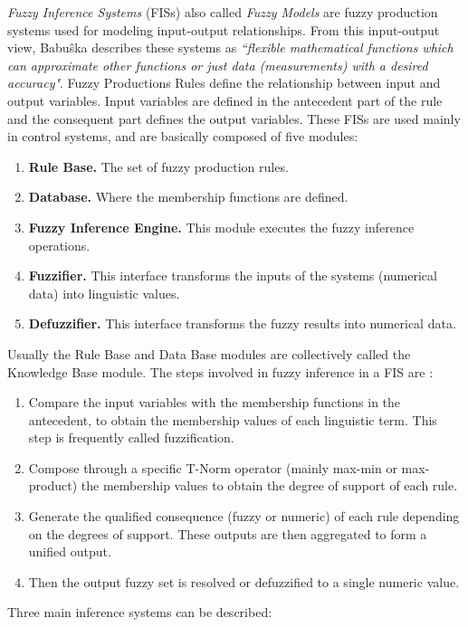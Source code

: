\textit{Fuzzy Inference Systems} (FISs) also called \textit{Fuzzy
Models} are fuzzy production systems used for modeling input-output
relationships. From this input-output view, Babuŝka
\cite{babuvska1996fuzzy} describes these systems as \textit{``flexible
mathematical functions which can approximate other functions or just
data (measurements) with a desired accuracy"}. Fuzzy Productions Rules
define the relationship between input and output variables. Input
variables are defined in the antecedent part of the rule and the
consequent part defines the output variables. These FISs are used
mainly in control systems, and are basically composed of five
modules\cite{babuvska1996fuzzy}:
\begin{enumerate}  
\item \textbf{Rule Base.} The set of fuzzy production rules.
\item \textbf{Database.} Where the membership functions are defined.
\item \textbf{Fuzzy Inference Engine.} This module executes the 
fuzzy inference operations.
\item \textbf{Fuzzifier.} This interface transforms the inputs 
of the systems (numerical data) into linguistic values.
\item \textbf{Defuzzifier.} This interface transforms the fuzzy 
results into numerical data.
\end{enumerate}
Usually the Rule Base and Data Base modules are collectively 
called the Knowledge Base module. The steps involved in fuzzy 
inference in a FIS are \cite{dubois1980fuzzy}:
\begin{enumerate} 
\item Compare the input variables with the membership functions 
in the antecedent, to obtain the membership values of each 
linguistic term. This step is frequently called fuzzification.
\item Compose through a specific T-Norm operator (mainly max-min 
or max-product) the membership values to obtain the degree of 
support of each rule.
\item Generate the qualified consequence (fuzzy or numeric) of 
each rule depending on the degrees of support. These outputs 
are then aggregated to form a unified output.
\item Then the output fuzzy set is resolved or defuzzified 
to a single numeric value.
\end{enumerate} 
Three main inference systems can be described:
